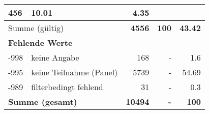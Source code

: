 \begin{longtable}{lXrrr}
       \num{456} &
       \num[round-mode=places,round-precision=2]{10.01} &
         \num[round-mode=places,round-precision=2]{4.35} \\
     \midrule
     \multicolumn{2}{l}{Summe (gültig)} &
       \textbf{\num{4556}} &
     \textbf{\num{100}} &
       \textbf{\num[round-mode=places,round-precision=2]{43.42}} \\
     \multicolumn{5}{l}{\textbf{Fehlende Werte}}\\
       -998 &
       keine Angabe &
         \num{168} &
        - &
         \num[round-mode=places,round-precision=2]{1.6} \\
       -995 &
       keine Teilnahme (Panel) &
         \num{5739} &
        - &
         \num[round-mode=places,round-precision=2]{54.69} \\
       -989 &
       filterbedingt fehlend &
         \num{31} &
        - &
         \num[round-mode=places,round-precision=2]{0.3} \\
     \midrule
     \multicolumn{2}{l}{\textbf{Summe (gesamt)}} &
          \textbf{\num{10494}} &
        \textbf{-} &
        \textbf{\num{100}} \\
     \bottomrule
     \end{longtable}
     
